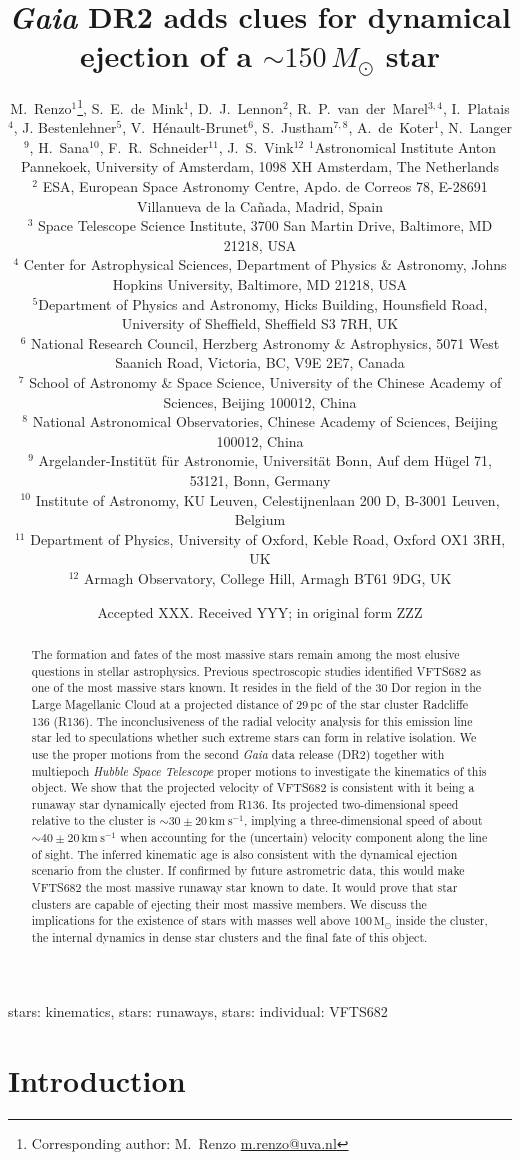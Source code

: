 \documentclass[a4paper,fleqn,usenatbib]{mnras}
\title[\emph{Gaia} DR2 adds clues for dynamical ejections of a $\sim$$150\,M_\odot$ star]{\emph{Gaia} DR2 adds clues for dynamical ejection of a $\sim$$150\,M_\odot$ star}
\author[Renzo et al.]{
M.~Renzo$^{1}$\thanks{Corresponding author: M.~Renzo
  \href{mailto:m.renzo@uva.nl}{m.renzo@uva.nl}},
S.~E.~de~Mink$^{1}$, \linebreak
D.~J.~Lennon$^{2}$,\linebreak
R.~P.~van~der~Marel$^{3,4}$, \linebreak
I.~Platais$^{4}$, \linebreak
J. Bestenlehner$^{5}$, \linebreak
V.~H\'enault-Brunet$^{6}$, \linebreak
S.~Justham$^{7,8}$, \linebreak
A.~de~Koter$^{1}$, \linebreak
N.~Langer$^{9}$, \linebreak
H.~Sana$^{10}$, \linebreak
F.~R.~Schneider$^{11}$, \linebreak
J.~S.~Vink$^{12}$ \linebreak
$^{1}${Astronomical Institute Anton Pannekoek, University of
  Amsterdam, 1098 XH Amsterdam, The Netherlands} \\
$^{2}$ {ESA, European Space Astronomy Centre, Apdo. de Correos 78,
  E-28691 Villanueva de la Ca\~nada, Madrid, Spain} \\
$^{3}$ {Space Telescope Science Institute, 3700 San Martin Drive,
  Baltimore, MD 21218, USA}\\
$^{4}$ {Center for Astrophysical Sciences, Department of Physics \& Astronomy, Johns Hopkins University, Baltimore, MD 21218, USA}\\
$^{5}${Department of Physics and Astronomy, Hicks Building,
  Hounsfield Road, University of Sheffield, Sheffield S3 7RH, UK}\\
$^{6}$ {National Research Council, Herzberg Astronomy \&
  Astrophysics, 5071 West Saanich Road, Victoria, BC, V9E 2E7,
  Canada}\\
$^{7}$ {School of Astronomy \& Space Science, University of the Chinese
  Academy of Sciences, Beijing 100012, China}\\
$^{8}$ {National Astronomical Observatories, Chinese Academy of
  Sciences, Beijing 100012, China}\\
$^{9}$ {Argelander-Instit\"ut f\"ur Astronomie, Universit\"at Bonn,
  Auf dem H\"ugel 71, 53121, Bonn, Germany}\\
$^{10}$ {Institute of Astronomy, KU Leuven, Celestijnenlaan 200 D, B-3001 Leuven, Belgium}\\
$^{11}$ {Department of Physics, University of Oxford, Keble Road,
  Oxford OX1 3RH, UK} \\
$^{12}$ {Armagh Observatory, College Hill, Armagh BT61 9DG, UK}
}
\date{Accepted XXX. Received YYY; in original form ZZZ}
\newcommand{\kms}{{\,\mathrm{km\ s^{-1}}}}
\newcommand{\Msun}{{\,\mathrm{M}_\odot}}
\begin{document}
\label{firsxtpage}
\pagerange{\pageref{firstpage}--\pageref{lastpage}}
\maketitle

\begin{abstract}
  The formation and fates of the most massive stars remain among the most elusive questions in stellar astrophysics. 
  Previous spectroscopic studies identified VFTS682 as one of the most
  massive stars known. It resides in the field of the 30 Dor region in
  the Large Magellanic Cloud at a projected distance of 29\,pc of the
  star cluster Radcliffe 136 (R136). The inconclusiveness of the radial
  velocity analysis for this emission line star led to speculations whether such extreme
  stars can form in relative isolation. 
  We use the proper motions from the second \emph{Gaia} data
  release (DR2) together with multiepoch \emph{Hubble Space Telescope} proper motions to investigate the kinematics of this object. We show
  that the projected velocity of VFTS682 is consistent with it being a
  runaway star dynamically ejected from R136. Its
  projected two-dimensional speed relative to the cluster is $\sim$$30\pm20\kms$, implying a three-dimensional speed of about $\sim$$40\pm20\kms$ when
  accounting for the (uncertain) velocity component along the line of sight. The
  inferred kinematic age is also  consistent with the dynamical ejection scenario from the cluster. 
  If confirmed by future astrometric data, this would make VFTS682
  the most massive runaway star known to date. It would prove that star clusters are capable of ejecting their most massive members. We discuss the implications for the existence of stars with masses well above $100\Msun$ inside the cluster, the internal dynamics in dense star clusters and the final fate of this object. 
\end{abstract}

\begin{keywords}
  stars: kinematics, stars: runaways, stars: individual: VFTS682
\end{keywords}



\section{Introduction}
\label{sec:intro}
\end{document}
